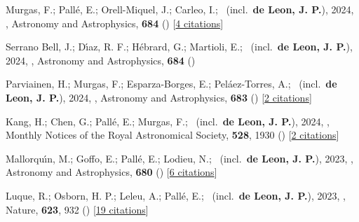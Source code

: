 \item[{\color{numcolor}\scriptsize62}] Murgas, F.; Pall{\'e}, E.; Orell-Miquel, J.; Carleo, I.; \etal\ (incl.\ \textbf{de Leon, J. P.}), 2024, , Astronomy and Astrophysics, \textbf{684} () [\href{https://ui.adsabs.harvard.edu/abs/2024A&A...684A..83M}{4 citations}]

\item[{\color{numcolor}\scriptsize61}] Serrano Bell, J.; D{\'\i}az, R. F.; H{\'e}brard, G.; Martioli, E.; \etal\ (incl.\ \textbf{de Leon, J. P.}), 2024, , Astronomy and Astrophysics, \textbf{684} ()

\item[{\color{numcolor}\scriptsize60}] Parviainen, H.; Murgas, F.; Esparza-Borges, E.; Pel{\'a}ez-Torres, A.; \etal\ (incl.\ \textbf{de Leon, J. P.}), 2024, , Astronomy and Astrophysics, \textbf{683} () [\href{https://ui.adsabs.harvard.edu/abs/2024A&A...683A.170P}{2 citations}]

\item[{\color{numcolor}\scriptsize59}] Kang, H.; Chen, G.; Pall{\'e}, E.; Murgas, F.; \etal\ (incl.\ \textbf{de Leon, J. P.}), 2024, , Monthly Notices of the Royal Astronomical Society, \textbf{528}, 1930 () [\href{https://ui.adsabs.harvard.edu/abs/2024MNRAS.528.1930K}{2 citations}]

\item[{\color{numcolor}\scriptsize58}] Mallorqu{\'\i}n, M.; Goffo, E.; Pall{\'e}, E.; Lodieu, N.; \etal\ (incl.\ \textbf{de Leon, J. P.}), 2023, , Astronomy and Astrophysics, \textbf{680} () [\href{https://ui.adsabs.harvard.edu/abs/2023A&A...680A..76M}{6 citations}]

\item[{\color{numcolor}\scriptsize57}] Luque, R.; Osborn, H. P.; Leleu, A.; Pall{\'e}, E.; \etal\ (incl.\ \textbf{de Leon, J. P.}), 2023, , Nature, \textbf{623}, 932 () [\href{https://ui.adsabs.harvard.edu/abs/2023Natur.623..932L}{19 citations}]

